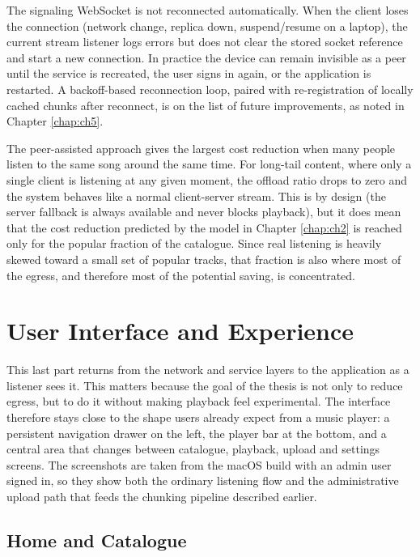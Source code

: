 \indent \par The signaling WebSocket is not reconnected automatically. When the client loses the connection (network change, replica down, suspend/resume on a laptop), the current stream listener logs errors but does not clear the stored socket reference and start a new connection. In practice the device can remain invisible as a peer until the service is recreated, the user signs in again, or the application is restarted. A backoff-based reconnection loop, paired with re-registration of locally cached chunks after reconnect, is on the list of future improvements, as noted in Chapter \ref{chap:ch5}.

\indent \par The peer-assisted approach gives the largest cost reduction when many people listen to the same song around the same time. For long-tail content, where only a single client is listening at any given moment, the offload ratio drops to zero and the system behaves like a normal client-server stream. This is by design (the server fallback is always available and never blocks playback), but it does mean that the cost reduction predicted by the model in Chapter \ref{chap:ch2} is reached only for the popular fraction of the catalogue. Since real listening is heavily skewed toward a small set of popular tracks, that fraction is also where most of the egress, and therefore most of the potential saving, is concentrated.

\section{User Interface and Experience}
\label{sec:gui-manual}

\indent \par This last part returns from the network and service layers to the application as a listener sees it. This matters because the goal of the thesis is not only to reduce egress, but to do it without making playback feel experimental. The interface therefore stays close to the shape users already expect from a music player: a persistent navigation drawer on the left, the player bar at the bottom, and a central area that changes between catalogue, playback, upload and settings screens. The screenshots are taken from the macOS build with an admin user signed in, so they show both the ordinary listening flow and the administrative upload path that feeds the chunking pipeline described earlier.

\subsection{Home and Catalogue}
\label{subsec:gui-home-catalogue}

